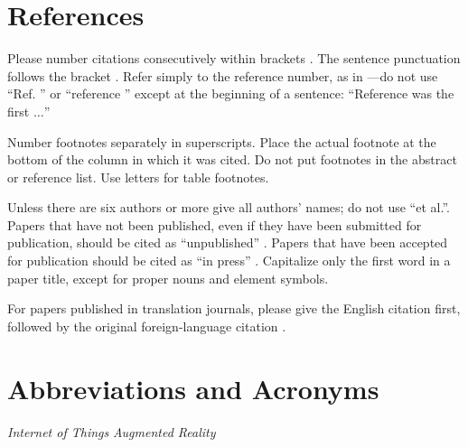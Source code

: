 \documentclass[conference]{ieeetran}
\begin{document}
\section*{References}

Please number citations consecutively within brackets \cite{shu2016cardea}. The 
sentence punctuation follows the bracket \cite{dufaux2010framework}. Refer simply to the reference 
number, as in \cite{denning2014situ}---do not use ``Ref. \cite{denning2014situ}'' or ``reference \cite{denning2014situ}'' except at 
the beginning of a sentence: ``Reference \cite{lu2017privacy} was the first $\ldots$''

Number footnotes separately in superscripts.\cite{chinomi2008PriSurv} Place the actual footnote at 
the bottom of the column in which it was cited. Do not put footnotes in the 
abstract or reference list. Use letters for table footnotes.

Unless there are six authors or more give all authors' names; do not use 
``et al.''. Papers that have not been published, even if they have been 
submitted for publication, should be cited as ``unpublished'' \cite{lu2017privacy}. Papers 
that have been accepted for publication should be cited as ``in press'' \cite{olteanu2018consensual}. 
Capitalize only the first word in a paper title, except for proper nouns and 
element symbols.\cite{sen2016ipic}

For papers published in translation journals, please give the English 
citation first, followed by the original foreign-language citation \cite{olteanu2018consensual}.

\section*{Abbreviations and Acronyms}
\begin{acronym}[Bash]
 {\textit{Internet of Things}}
 {\textit{Augmented Reality}}
\end{acronym}


{\footnotesize
}
\end{document}
